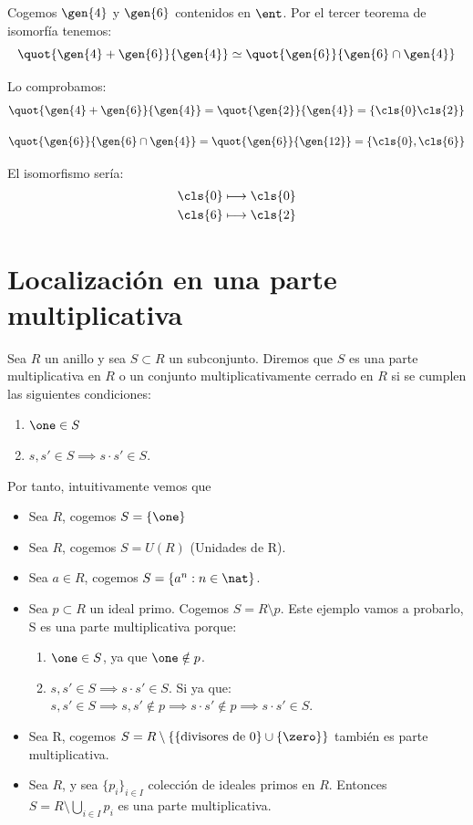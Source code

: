 \begin{example}
	Cogemos $\gen{4}$ y $\gen{6}$ contenidos en $\ent$. Por el tercer teorema de isomorfía tenemos:
	$$ \quot{\gen{4}+\gen{6}}{\gen{4}}\simeq \quot{\gen{6}}{\gen{6} \cap \gen{4}} $$

	Lo comprobamos:
	$$\quot{\gen{4}+\gen{6}}{\gen{4}} = \quot{\gen{2}}{\gen{4}}=\{ \cls{0} \cls{2} \}$$

	$$ \quot{\gen{6}}{\gen{6} \cap \gen{4}} = \quot{\gen{6}}{\gen{12}} = \{ \cls{0}, \cls{6} \}$$

	El isomorfismo sería:
	\begin{align*}
		\cls{0}  & \longmapsto  \cls{0}\\
		\cls{6} & \longmapsto \cls{2} \\
	\end{align*}
\end{example}

\section{Localización en una parte multiplicativa}
\begin{defn}
	Sea $R$ un anillo y sea $S\subset R$ un subconjunto. Diremos que $S$ es una parte multiplicativa en $R$ o un conjunto multiplicativamente cerrado en $R$ si se cumplen las siguientes condiciones:
	\begin{enumerate}
		\item $\one \in S$
		\item $s,s' \in S \implies s\cdot s' \in S$.
	\end{enumerate}
\end{defn}

Por tanto, intuitivamente vemos que

\begin{example}
	\begin{itemize}
		\item Sea $R$, cogemos $S=\{\one \}$
		\item Sea $R$, cogemos $S=U(R)$ (Unidades de R).
		\item Sea $a \in R$, cogemos $S=\{ a^n: n \in \nat \}$.
		\item Sea $p \subset R$ un ideal primo. Cogemos $S=R \setminus p$. Este ejemplo vamos a probarlo, S es una parte multiplicativa porque:
		\begin{enumerate}
			\item $\one \in S$, ya que $\one \notin p$.
			\item $s,s' \in S \implies s\cdot s' \in S$. Si ya que: $s,s' \in S \implies s,s' \notin p \implies s\cdot s' \notin p \implies s\cdot s' \in S$.
		\end{enumerate}
		\item Sea R, cogemos $S= R \setminus \{\{ \text{divisores de 0}\}\cup \{ \zero \} \}$ también es parte multiplicativa.
		\item Sea $R$, y sea $\{p_i\}_{i\in I}$ colección de ideales primos en $R$. Entonces $S=R\setminus \bigcup_{i\in I}p_i$ es una parte multiplicativa.
	\end{itemize}
\end{example}

